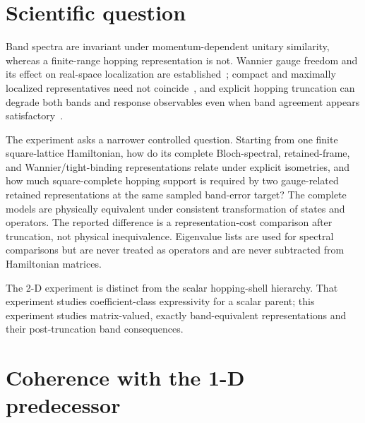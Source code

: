 \documentclass[11pt]{article}
\begin{document}
\section{Scientific question}

Band spectra are invariant under momentum-dependent unitary similarity, whereas a
finite-range hopping representation is not. Wannier gauge freedom and its effect on
real-space localization are established~\cite{marzari1997,marzari2012,marrazzo2024};
compact and maximally localized representatives need not coincide~\cite{sathe2024}, and
explicit hopping truncation can degrade both bands and response observables even when
band agreement appears satisfactory~\cite{ghosh2025}.

The experiment asks a narrower controlled question. Starting from one finite
square-lattice Hamiltonian, how do its complete Bloch-spectral, retained-frame, and
Wannier/tight-binding representations relate under explicit isometries, and how much
square-complete hopping support is required by two gauge-related retained
representations at the same sampled band-error target? The complete models are
physically equivalent under consistent transformation of states and operators. The
reported difference is a representation-cost comparison after truncation, not physical
inequivalence. Eigenvalue lists are used for spectral comparisons but are never treated
as operators and are never subtracted from Hamiltonian matrices.

The 2-D experiment is distinct from the scalar hopping-shell hierarchy. That experiment
studies coefficient-class expressivity for a scalar parent; this experiment studies
matrix-valued, exactly band-equivalent representations and their post-truncation band
consequences.

\section{Coherence with the 1-D predecessor}
\end{document}
